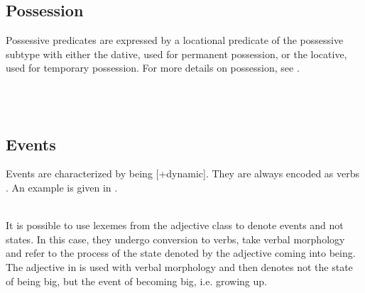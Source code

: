

\subsection{Possession}\label{sec:func:pred:Possession}
Possessive predicates are expressed by a locational predicate of the possessive subtype with either the dative, used for permanent possession, or the locative, used for temporary possession. For more details on possession, see .


 \\

 \\
\subsection{Events}\label{sec:func:Events}
Events are characterized by being [+dynamic]. They  are always encoded as verbs . An example is given in .

 \\
It is possible to use lexemes from the adjective class to denote events and not states. In this case, they undergo conversion to verbs, take verbal morphology and refer to  the process of the state denoted by the adjective coming into being. The adjective  in  is used with verbal morphology and then denotes not the state of being big, but the event of becoming big, i.e. growing up.

